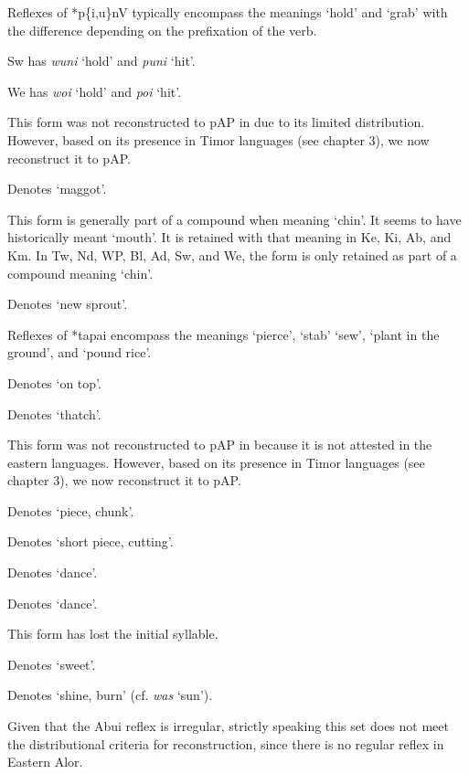 {\tablenotetext}{Reflexes of *p\{i,u\}nV typically encompass the meanings `hold' and `grab' with the difference depending on the prefixation of the verb.}

{\tablenotetext}{Sw has \textit{wuni} `hold' and \textit{puni }`hit'.}

{\tablenotetext}{We has \textit{woi}\textit{{\ng}} `hold' and \textit{poi}\textit{{\ng}} `hit'.}

{\tablenotetext}{This form was not reconstructed to pAP in \citet{HoltonEtAl2012} due to its limited distribution. However, based on its presence in Timor languages (see chapter 3), we now reconstruct it to pAP.}

{\tablenotetext}{Denotes `maggot'.}

{\tablenotetext}{This form is generally part of a compound when meaning `chin'. It seems to have historically meant `mouth'. It is retained with that meaning in Ke, Ki, Ab, and Km. In Tw, Nd, WP, Bl, Ad, Sw, and We, the form is only retained as part of a compound meaning `chin'.}

{\tablenotetext}{Denotes `new sprout'.}

{\tablenotetext}{Reflexes of *tapai encompass the meanings `pierce', `stab' `sew', `plant in the ground', and `pound rice'. }

{\tablenotetext}{Denotes `on top'.}

{\tablenotetext}{Denotes `thatch'.}

{\tablenotetext}{This form was not reconstructed to pAP in \citet{HoltonEtAl2012} because it is not attested in the eastern languages. However, based on its presence in Timor languages (see chapter 3), we now reconstruct it to pAP.}

{\tablenotetext}{Denotes `piece, chunk'.}

{\tablenotetext}{Denotes `short piece, cutting'.}

{\tablenotetext}{Denotes `dance'.}

{\tablenotetext}{Denotes `dance'.}

{\tablenotetext}{This form has lost the initial syllable. }

{\tablenotetext}{Denotes `sweet'.}

{\tablenotetext}{Denotes `shine, burn' (cf. \textit{was }`sun').}

{\tablenotetext}{Given that the Abui reflex is irregular, strictly speaking this set does not meet the distributional criteria for reconstruction, since there is no regular reflex in Eastern Alor. }

